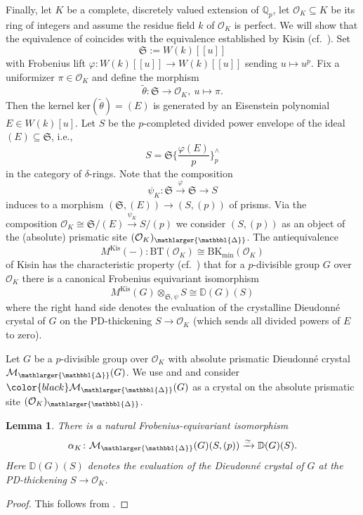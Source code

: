 \documentclass{amsart}
\newcommand{\prism}{{\mathlarger{\mathbbl{\Delta}}}}
\theoremstyle{plain}
\newtheorem{lemma}[theorem]{Lemma}
\theoremstyle{definition}
\newcommand{\red}[1]{{\color{black} #1}}
\begin{document}
Finally, let $K$ be a complete, discretely valued extension of $\mathbb{Q}_p$, let $\mathcal{O}_K\subseteq K$ be its ring of integers and assume the residue field $k$ of $\mathcal{O}_K$ is perfect. We will show that the equivalence of  coincides with the equivalence established by Kisin (cf.\ \cite[Theorem 0.4]{kisin_crystalline_representations_and_f_crystals}). Set
$$
\mathfrak{S}:=W(k)[[u]]
$$
with Frobenius lift $\varphi\colon W(k)[[u]]\to W(k)[[u]]$ sending $u\mapsto u^p$.
Fix a uniformizer $\pi\in \mathcal{O}_K$ and define the morphism
$$
\tilde{\theta}\colon \mathfrak{S}\to \mathcal{O}_K,\ u\mapsto \pi.
$$
Then the kernel $\mathrm{ker}(\tilde{\theta})=(E)$ is generated by an Eisenstein polynomial $E\in W(k)[u]$. Let $S$ be the $p$-completed divided power envelope of the ideal $(E)\subseteq \mathfrak{S}$, i.e.,
$$
S=\mathfrak{S}\{\frac{\varphi(E)}{p}\}^\wedge_p
$$
in the category of $\delta$-rings. Note that the composition
$$
\psi_K\colon \mathfrak{S}\xrightarrow{\varphi}\mathfrak{S}\to S
$$
induces to a morphism $(\mathfrak{S},(E))\to (S,(p))$ of prisms. Via the composition $\mathcal{O}_K\cong \mathfrak{S}/(E)\xrightarrow{\psi_K} S/(p)$  we consider $(S,(p))$ as an object of the (absolute) prismatic site $(\mathcal{O}_K)_\prism$.
The antiequivalence
$$
M^{\mathrm{Kis}}(-)\colon \mathrm{BT}(\mathcal{O}_K)\cong \mathrm{BK}_{\mathrm{min}}(\mathcal{O}_K)
$$
of Kisin has the characteristic property (cf.\ \cite[Theorem (2.2.7)]{kisin_crystalline_representations_and_f_crystals}) that for a $p$-divisible group $G$ over $\mathcal{O}_K$ there is a canonical Frobenius equivariant isomorphism
$$
M^{\mathrm{Kis}}(G)\otimes_{\mathfrak{S},\psi}S\cong \mathbb{D}(G)(S)
$$
where the right hand side denotes the evaluation of the crystalline Dieudonn\'e crystal of $G$ on the PD-thickening $S\to \mathcal{O}_K$ (which sends all divided powers of $E$ to zero).

Let $G$ be a $p$-divisible group over $\mathcal{O}_K$ with absolute prismatic Dieudonn\'e crystal \red{$\mathcal{M}_\prism(G)$}. We use  and  and consider $\red{\mathcal{M}_\prism(G)}$ as a crystal on the absolute prismatic site $(\mathcal{O}_K)_\prism$.

\begin{lemma}
  \label{sec:comp-over-mathc-comparison-over-s-with-crystalline-dieudonne-module} There is a natural Frobenius-equivariant isomorphism
  $$
  \alpha_K\colon \mathcal{M}_\prism(G)(S,(p))\xrightarrow{\simeq} \mathbb{D}(G)(S).
  $$
  Here $\mathbb{D}(G)(S)$ denotes the evaluation of the Dieudonn\'e crystal of $G$ at the PD-thickening $S\to \mathcal{O}_K$. 
\end{lemma}
\begin{proof}
  This follows from .
\end{proof}
\end{document}

